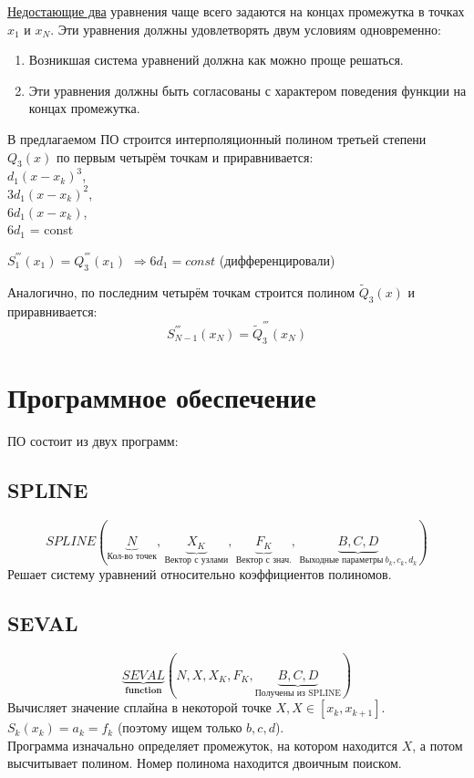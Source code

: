 \documentclass[a4paper,11pt]{article}
\begin{document}
\underline{Недостающие два} уравнения чаще всего задаются на концах промежутка в точках $x_1$ и $x_N$. Эти уравнения должны удовлетворять двум условиям одновременно:
\begin{enumerate}
  \item Возникшая система уравнений должна как можно проще решаться.
  \item Эти уравнения должны быть согласованы с характером поведения функции на концах промежутка.
\end{enumerate}
В предлагаемом ПО строится интерполяционный полином третьей степени $Q_3(x)$ по первым четырём точкам и приравнивается: \\
\marginpar
{
  \footnotesize {
    $d_1(x-x_k)^3$, \\
    $3d_1(x-x_k)^2$, \\
    $6d_1(x-x_k)$, \\
    $6d_1$ = const
  }
}
\begin{center}
  $S^{'''}_1(x_1) = Q^{'''}_3(x_1)$ $\Rightarrow 6d_1 = const$ \small{(дифференцировали)} \\
\end{center}
Аналогично, по последним четырём точкам строится полином $\widetilde{Q}_3(x)$ и приравнивается:
\[ S^{'''}_{N - 1}(x_N) = \widetilde{Q}^{'''}_3(x_N) \]

\section{Программное обеспечение}
ПО состоит из двух программ:
  \subsection{SPLINE}
  \[SPLINE(\underbrace{N}_{\text{Кол-во точек}},\,\underbrace{X_K}_{\text{Вектор с узлами}},\,
                    \underbrace{F_K}_{\text{Вектор с знач.}},\,\underbrace{B, C, D}_{\textbf{Выходные параметры}\ b_k, c_k, d_k})\]
  Решает систему уравнений относительно коэффициентов полиномов.
  \subsection{SEVAL}
  \[\underbrace{SEVAL}_{\textbf{function}}(N, X, X_K, F_K, \underbrace{B, C, D}_{\text{Получены из SPLINE}})\]
  Вычисляет значение сплайна в некоторой точке $X, X \in [x_k, x_{k+1}]$. \\
  $S_k(x_k)=a_k=f_k$ (поэтому ищем только $b,c,d$).\\
  Программа изначально определяет промежуток, на котором находится $X$, а потом высчитывает полином. Номер полинома находится двоичным поиском.
\end{document}
